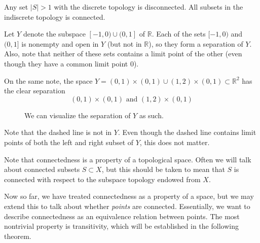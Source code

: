   \begin{example}
    Any set $|S| > 1$ with the discrete topology is disconnected. All subsets in the indiscrete topology is connected.  
  \end{example}

  \begin{example} 
    Let $Y$ denote the subspace $[-1,0) \cup (0,1]$ of $\mathbb{R}$. Each of the sets $[-1,0)$ and $(0,1]$ is nonempty and open in $Y$ (but not in $\mathbb{R}$), so they form a separation of $Y$. Also, note that neither of these sets contains a limit point of the other (even though they have a common limit point $0$). 

    On the same note, the space $Y = (0,1) \times (0,1) \cup (1,2) \times (0,1) \subset \mathbb{R}^2$ has the clear separation 
    \begin{equation}
      (0, 1) \times (0, 1) \text{ and } (1, 2) \times (0, 1)
    \end{equation}

    \begin{figure}[H]
      \centering 
      \caption{We can visualize the separation of $Y$ as such. } 
      \label{fig:separation_of_rectangle}
    \end{figure}
    Note that the dashed line is not in $Y$. Even though the dashed line contains limit points of both the left and right subset of $Y$, this does not matter. 
  \end{example} 

  Note that connectedness is a property of a topological space. Often we will talk about connected subsets $S \subset X$, but this should be taken to mean that $S$ is connected with respect to the subspace topology endowed from $X$.

  Now so far, we have treated connectedness as a property of a space, but we may extend this to talk about whether \textit{points} are connected. Essentially, we want to describe connectedness as an equivalence relation between points. The most nontrivial property is transitivity, which will be established in the following theorem. 

